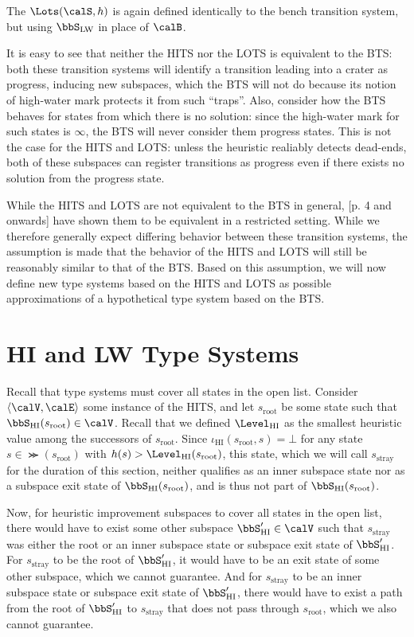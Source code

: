 The  $\Lots(\calS,h)$ is again defined identically to the bench transition system, but using $\bbS_\text{LW}$ in place of $\calB$.

It is easy to see that neither the HITS nor the LOTS is equivalent to the BTS: both these transition systems will identify a transition leading into a crater as progress, inducing new subspaces, which the BTS will not do because its notion of high-water mark protects it from such ``traps''. Also, consider how the BTS behaves for states from which there is no solution: since the high-water mark for such states is $\infty$, the BTS will never consider them progress states. This is not the case for the HITS and LOTS: unless the heuristic realiably detects dead-ends, both of these subspaces can register transitions as progress even if there exists no solution from the progress state.

While the HITS and LOTS are not equivalent to the BTS in general, [p. 4 and onwards] have shown them to be equivalent in a restricted setting. While we therefore generally expect differing behavior between these transition systems, the assumption is made that the behavior of the HITS and LOTS will still be reasonably similar to that of the BTS. Based on this assumption, we will now define new type systems based on the HITS and LOTS as possible approximations of a hypothetical type system based on the BTS.

\section{HI and LW Type Systems}

Recall that type systems must cover all states in the open list. Consider $\langle\calV,\calE\rangle$ some instance of the HITS, and let $s_\text{root}$ be some state such that $\bbS_\text{HI}(s_\text{root})\in\calV$. Recall that we defined $\Level_\text{HI}$ as the smallest heuristic value among the successors of $s_\text{root}$. Since $\iota_\text{HI}(s_\text{root},s)=\bot$ for any state $s\in\Succ(s_\text{root})$ with $h(s)>\Level_\text{HI}(s_\text{root})$, this state, which we will call $s_\text{stray}$ for the duration of this section, neither qualifies as an inner subspace state nor as a subspace exit state of $\bbS_\text{HI}(s_\text{root})$, and is thus not part of $\bbS_\text{HI}(s_\text{root})$.

Now, for heuristic improvement subspaces to cover all states in the open list, there would have to exist some other subspace $\bbS_\text{HI}'\in\calV$ such that $s_\text{stray}$ was either the root or an inner subspace state or subspace exit state of $\bbS_\text{HI}'$. For $s_\text{stray}$ to be the root of $\bbS_\text{HI}'$, it would have to be an exit state of some other subspace, which we cannot guarantee. And for $s_\text{stray}$ to be an inner subspace state or subspace exit state of $\bbS_\text{HI}'$, there would have to exist a path from the root of $\bbS_\text{HI}'$ to $s_\text{stray}$ that does not pass through $s_\text{root}$, which we also cannot guarantee.

